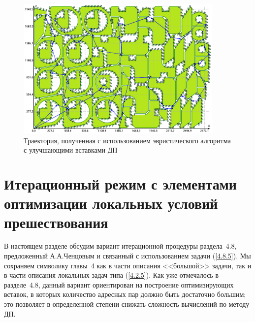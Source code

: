 \documentclass[11pt,twoside,openany]{report}
\begin{document}
{{\begin{figure}
  \begin{center}
  \includegraphics[width=0.9\textwidth]{routing_75_checking_ins.png}
  \caption{Траектория, полученная с использованием эвристического алгоритма с
улучшающими вставками ДП}
  \label{DP_Inserts_Result}
  \end{center}
\end{figure}















\section{Итерационный режим с элементами оптимизации локальных условий
прешествования}
\setcounter{equation}{0}

В настоящем разделе обсудим вариант итерационной процедуры раздела~4.8,
предложенный А.А.Ченцовым и связанный с использованием задачи (\ref{4.8.5}).
Мы сохраняем символику главы~4 как в части описания <<большой>> задачи, так
и в части описания локальных задач типа (\ref{4.2.5}). Как уже отмечалось
в разделе~4.8, данный вариант ориентирован на построение оптимизирующих вставок,
в которых количество адресных пар должно быть достаточно большим; это позволяет
в определенной степени снижать сложность вычислений по методу ДП.

}}
\end{document}
